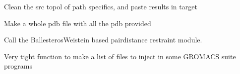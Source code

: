 \documentclass[letterpaper,10pt,english]{sphinxmanual}
\begin{document}

\begin{fulllineitems}
\label{\detokenize{utils:utils.clean_topol}}
\pysigstartsignatures
{}
\pysigstopsignatures
\sphinxAtStartPar
Clean the src topol of path specifics, and paste results in target

\end{fulllineitems}


\begin{fulllineitems}
\label{\detokenize{utils:utils.concat}}
\pysigstartsignatures
{}
\pysigstopsignatures
\sphinxAtStartPar
Make a whole pdb file with all the pdb provided

\end{fulllineitems}


\begin{fulllineitems}
\label{\detokenize{utils:utils.getbw}}
\pysigstartsignatures
{}
\pysigstopsignatures
\sphinxAtStartPar
Call the Ballesteros\sphinxhyphen{}Weistein based pair\sphinxhyphen{}distance restraint
module.

\end{fulllineitems}


\begin{fulllineitems}
\label{\detokenize{utils:utils.make_cat}}
\pysigstartsignatures
{}
\pysigstopsignatures
\sphinxAtStartPar
Very tight function to make a list of files to inject
in some GROMACS suite programs

\end{fulllineitems}
\end{document}

